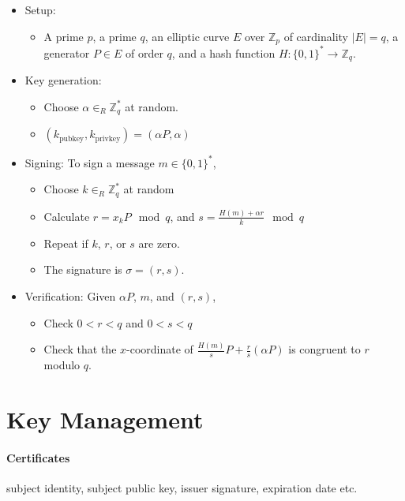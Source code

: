 \documentclass[11pt]{article}
\begin{document}
\begin{itemize}
  \item Setup:
  \begin{itemize}
    \item A prime $p$, a prime $q$, an elliptic curve $E$ over $\mathbb{Z}_p$ of cardinality $|E| = q$, a generator $P \in E$ of order $q$, and a hash function $H: \{0,1\}^* \to \mathbb{Z}_q$.
  \end{itemize}
  
  \item Key generation:
  \begin{itemize}
    \item Choose $\alpha \in_R \mathbb{Z}_q^*$ at random.
    \item $(k_{\text{pubkey}}, k_{\text{privkey}}) = (\alpha P, \alpha)$
  \end{itemize}
  
  \item Signing: To sign a message $m \in \{0,1\}^*$,
  \begin{itemize}
    \item Choose $k \in_R \mathbb{Z}_q^*$ at random
    \item Calculate $r = x_kP \mod q$, and $s = \frac{H(m) + \alpha r}{k} \mod q$
    \item Repeat if $k$, $r$, or $s$ are zero.
    \item The signature is $\sigma = (r, s)$.
  \end{itemize}
  
  \item Verification: Given $\alpha P$, $m$, and $(r, s)$,
  \begin{itemize}
    \item Check $0 < r < q$ and $0 < s < q$
    \item Check that the $x$-coordinate of $\frac{H(m)}{s} P + \frac{r}{s} (\alpha P)$ is congruent to $r$ modulo $q$.
  \end{itemize}
\end{itemize}

\section{Key Management}

\paragraph{Certificates} subject identity, subject public key, issuer signature, expiration date etc.
\end{document}
